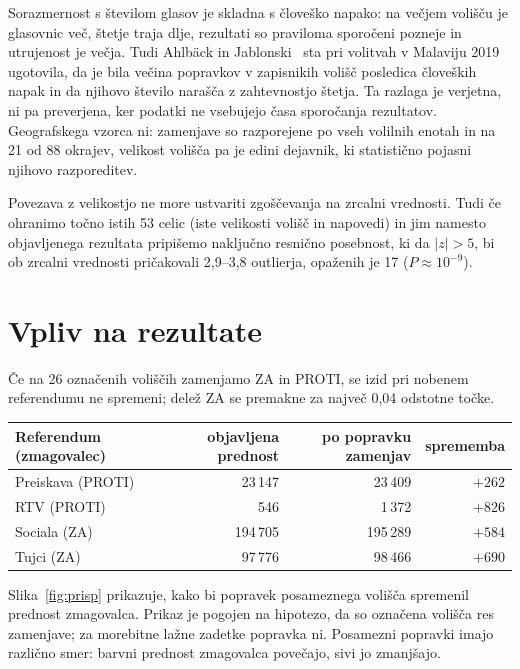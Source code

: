 \documentclass[11pt,a4paper]{article}
\begin{document}
Sorazmernost s številom glasov je skladna s človeško napako: na večjem volišču je glasovnic več, štetje traja dlje, rezultati so praviloma sporočeni pozneje in utrujenost je večja. Tudi Ahlbäck in Jablonski~\cite{ahlback2025} sta pri volitvah v Malaviju 2019 ugotovila, da je bila večina popravkov v zapisnikih volišč posledica človeških napak in da njihovo število narašča z zahtevnostjo štetja. Ta razlaga je verjetna, ni pa preverjena, ker podatki ne vsebujejo časa sporočanja rezultatov. Geografskega vzorca ni: zamenjave so razporejene po vseh volilnih enotah in na 21 od 88 okrajev, velikost volišča pa je edini dejavnik, ki statistično pojasni njihovo razporeditev.

Povezava z velikostjo ne more ustvariti zgoščevanja na zrcalni vrednosti. Tudi če ohranimo točno istih 53 celic (iste velikosti volišč in napovedi) in jim namesto objavljenega rezultata pripišemo naključno resnično posebnost, ki da $|z|>5$, bi ob zrcalni vrednosti pričakovali 2,9--3,8 outlierja, opaženih je 17 ($P\approx10^{-9}$).

\section{Vpliv na rezultate}

Če na 26 označenih voliščih zamenjamo ZA in PROTI, se izid pri nobenem referendumu ne spremeni; delež ZA se premakne za največ 0,04 odstotne točke.

\begin{center}
\small\begin{tabular}{lrrr}
\toprule
Referendum (zmagovalec) & objavljena prednost & po popravku zamenjav & sprememba \\
\midrule
Preiskava (PROTI) & 23\,147 & 23\,409 & $+262$ \\
RTV (PROTI) & 546 & 1\,372 & $+826$ \\
Sociala (ZA) & 194\,705 & 195\,289 & $+584$ \\
Tujci (ZA) & 97\,776 & 98\,466 & $+690$ \\
\bottomrule
\end{tabular}
\end{center}

Slika~\ref{fig:prisp} prikazuje, kako bi popravek posameznega volišča spremenil prednost zmagovalca. Prikaz je pogojen na hipotezo, da so označena volišča res zamenjave; za morebitne lažne zadetke popravka ni. Posamezni popravki imajo različno smer: barvni prednost zmagovalca povečajo, sivi jo zmanjšajo.
\end{document}
